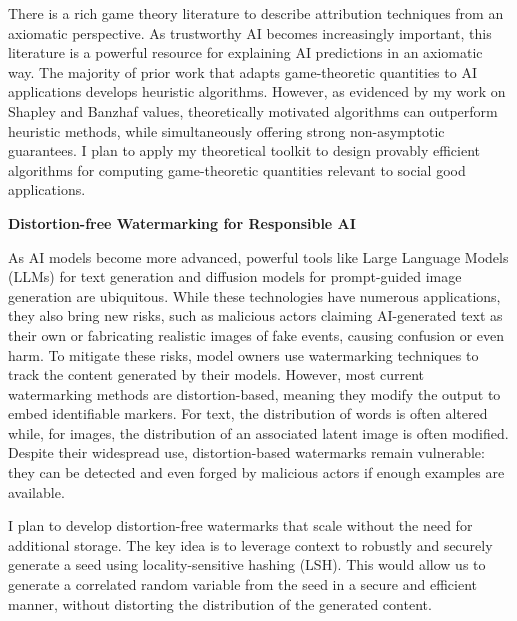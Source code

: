 \documentclass[11pt]{article}
\begin{document}
{There is a rich game theory literature to describe attribution techniques from an axiomatic perspective.
As trustworthy AI becomes increasingly important, this literature is a powerful resource for explaining AI predictions in an axiomatic way.
The majority of prior work that adapts game-theoretic quantities to AI applications develops heuristic algorithms.
However, as evidenced by my work on Shapley and Banzhaf values, theoretically motivated algorithms can outperform heuristic methods, while simultaneously offering strong non-asymptotic guarantees.
I plan to apply my theoretical toolkit to design provably efficient algorithms for computing game-theoretic quantities relevant to social good applications. 

{\large \textbf{Distortion-free Watermarking for Responsible AI}}

As AI models become more advanced, powerful tools like Large Language Models (LLMs) for text generation and diffusion models for prompt-guided image generation are ubiquitous. While these technologies have numerous applications, they also bring new risks, such as malicious actors claiming AI-generated text as their own or fabricating realistic images of fake events, causing confusion or even harm. To mitigate these risks, model owners use watermarking techniques to track the content generated by their models.
However, most current watermarking methods are distortion-based, meaning they modify the output to embed identifiable markers. For text, the distribution of words is often altered while, for images, the distribution of an associated latent image is often modified. Despite their widespread use, distortion-based watermarks remain vulnerable: they can be detected and even forged by malicious actors if enough examples are available.

I plan to develop distortion-free watermarks that scale without the need for additional storage.
The key idea is to leverage context to robustly and securely generate a seed using locality-sensitive hashing (LSH).
This would allow us to generate a correlated random variable from the seed in a secure and efficient manner, without distorting the distribution of the generated content.

}
\end{document}

